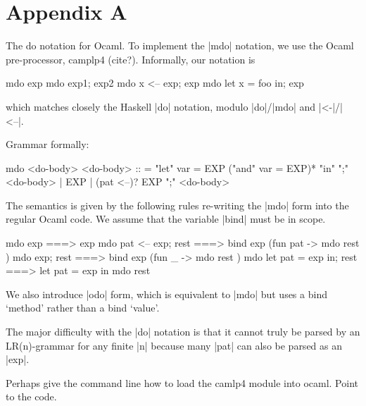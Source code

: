\documentclass{llncs}
\begin{document}



\section{Appendix A}
The do notation for Ocaml.
To implement the |mdo| notation, we use the Ocaml pre-processor,
camplp4 (cite?). Informally, our notation is
\begin{code}
mdo { exp }
mdo { exp1; exp2 }
mdo { x <-- exp; exp }
mdo { let x = foo in; exp }
\end{code}
which matches closely the Haskell |do| notation, modulo |do|/|mdo| and 
|<-|/|<--|.

Grammar formally:
\begin{code}
mdo { <do-body> }
<do-body> :: =
    "let" var = EXP ("and" var = EXP)* "in" ";" <do-body>
    | EXP
    | (pat <--)? EXP ";" <do-body>
\end{code}
The semantics is given by the following rules re-writing the |mdo|
form into the regular Ocaml code. We assume that the variable |bind|
must be in scope.
\begin{code}
mdo { exp } ===> exp
mdo { pat <-- exp; rest } ===> bind exp (fun pat -> mdo { rest })
mdo { exp; rest } ===> bind exp (fun _ -> mdo { rest })
mdo { let pat = exp in; rest } ===> let pat = exp in mdo { rest }
\end{code}
We also introduce |odo| form, which is equivalent to |mdo| but uses 
a bind `method' rather than a bind `value'.

The major difficulty with the |do| notation is that it cannot truly be
parsed by an LR(n)-grammar for any finite |n| because many |pat| can also
be parsed as an |exp|. 

Perhaps give the command line how to load the camlp4 module into
ocaml. Point to the code.
\end{document}
